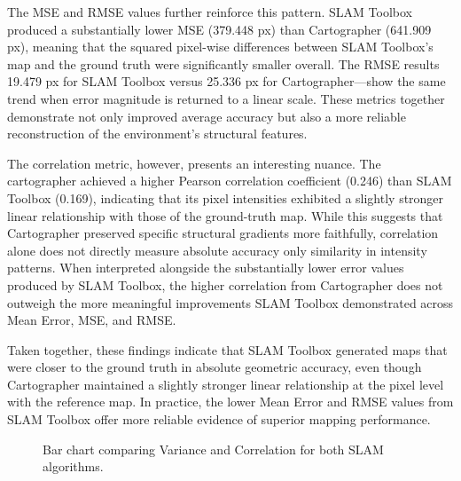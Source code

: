 \documentclass[runningheads,11pt]{llncs_bigfont_absbib}
\begin{document}
The MSE and RMSE values further reinforce this pattern. SLAM Toolbox produced a substantially lower MSE (379.448 px) than Cartographer (641.909 px), meaning that the squared pixel-wise differences between SLAM Toolbox’s map and the ground truth were significantly smaller overall. The RMSE results 19.479 px for SLAM Toolbox versus 25.336 px for Cartographer—show the same trend when error magnitude is returned to a linear scale. These metrics together demonstrate not only improved average accuracy but also a more reliable reconstruction of the environment's structural features.

The correlation metric, however, presents an interesting nuance. The cartographer achieved a higher Pearson correlation coefficient (0.246) than SLAM Toolbox (0.169), indicating that its pixel intensities exhibited a slightly stronger linear relationship with those of the ground-truth map. While this suggests that Cartographer preserved specific structural gradients more faithfully, correlation alone does not directly measure absolute accuracy only similarity in intensity patterns. When interpreted alongside the substantially lower error values produced by SLAM Toolbox, the higher correlation from Cartographer does not outweigh the more meaningful improvements SLAM Toolbox demonstrated across Mean Error, MSE, and RMSE.

Taken together, these findings indicate that SLAM Toolbox generated maps that were closer to the ground truth in absolute geometric accuracy, even though Cartographer maintained a slightly stronger linear relationship at the pixel level with the reference map. In practice, the lower Mean Error and RMSE values from SLAM Toolbox offer more reliable evidence of superior mapping performance. 


\begin{figure}[h!]
\centering
{}
\caption{Bar chart comparing Variance and Correlation for both SLAM algorithms.}
\end{figure}
\end{document}
